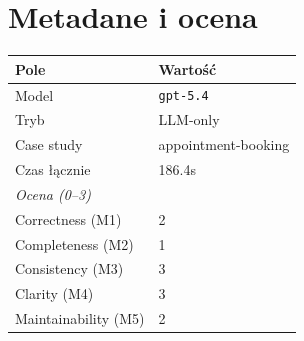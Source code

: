 \documentclass[12pt,a4paper]{article}
\begin{document}
\section{Metadane i ocena}

\begin{table}[h]
\begin{tabular}{ll}
\toprule
\textbf{Pole} & \textbf{Wartość} \\
\midrule
Model & \texttt{gpt-5.4} \\
Tryb & LLM-only \\
Case study & appointment-booking \\
Czas łącznie & 186.4s \\
\midrule
\textit{Ocena (0--3)} & \\
\midrule
Correctness (M1) & 2 \\
Completeness (M2) & 1 \\
Consistency (M3) & 3 \\
Clarity (M4) & 3 \\
Maintainability (M5) & 2 \\
\bottomrule
\end{tabular}
\end{table}
\end{document}
